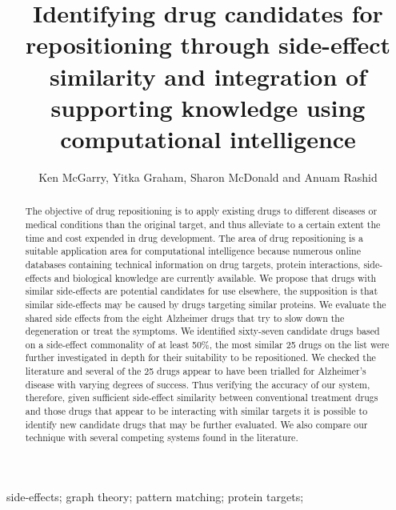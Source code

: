 \documentclass[preprint,11pt]{elsarticle}
\begin{document}
 
\begin{frontmatter}
\title{Identifying drug candidates for repositioning through side-effect similarity and integration of supporting knowledge using computational intelligence}
\author{Ken McGarry, Yitka Graham, Sharon McDonald and Anuam Rashid}
\address{School of Pharmacy and Pharmaceutical Sciences, Faculty of Health Sciences and Wellbeing,\\University of Sunderland, UK}

\begin{abstract}
The objective of drug repositioning is to apply existing drugs to different diseases or medical conditions than the original target, and thus alleviate to a certain extent the time and cost expended in drug development. The area of drug repositioning is a suitable application area for computational intelligence because numerous online databases containing technical information on drug targets, protein interactions, side-effects and biological knowledge are currently available. We propose that drugs with similar side-effects are potential candidates for use elsewhere, the supposition is that similar side-effects may be caused by drugs targeting similar proteins.  We evaluate the shared side effects from the eight Alzheimer drugs that try to slow down the degeneration or treat the symptoms. We identified sixty-seven candidate drugs based on a side-effect commonality of at least 50\%, the most similar 25 drugs on the list were further investigated in depth for their suitability to be repositioned. We checked the literature and several of the 25 drugs appear to have been trialled for Alzheimer's disease with varying degrees of success. Thus verifying the accuracy of our system, therefore, given sufficient side-effect similarity between conventional treatment drugs and those drugs that appear to be interacting with similar targets it is possible to identify new candidate drugs that may be further evaluated. We also compare our technique with several competing systems found in the literature.
\end{abstract}

\begin{keyword}
side-effects; graph theory; pattern matching; protein targets;
\end{keyword}

\end{frontmatter}
\end{document}
